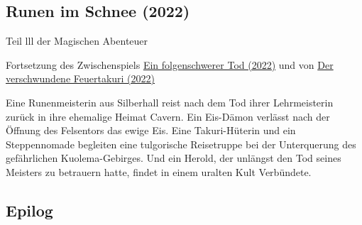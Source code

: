 
\begin{chapterbox}
    \chapter{Runen im Schnee (2022)}
    \label{2022-runen-im-schnee}

    \begin{center}
        Teil lll der Magischen Abenteuer
        
        Fortsetzung des Zwischenspiels \hyperref[2022-ein-folgenschwerer-tod]{Ein folgenschwerer Tod (2022)} und von \hyperref[2022-der-verschwundene-feuertakuri]{Der verschwundene Feuertakuri (2022)}
    \end{center}
    
    Eine Runenmeisterin aus Silberhall reist nach dem Tod ihrer Lehrmeisterin zurück in ihre ehemalige Heimat Cavern. Ein Eis-Dämon verlässt nach der Öffnung des Felsentors das ewige Eis. Eine Takuri-Hüterin und ein Steppennomade begleiten eine tulgorische Reisetruppe bei der Unterquerung des gefährlichen Kuolema-Gebirges. Und ein Herold, der unlängst den Tod seines Meisters zu betrauern hatte, findet in einem uralten Kult Verbündete.

\end{chapterbox}





\newpage
\section{Epilog}

